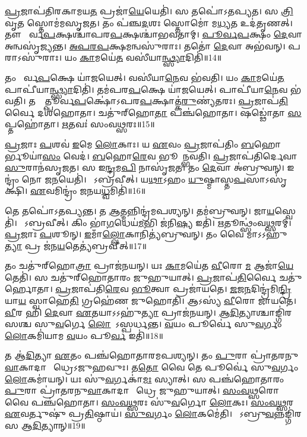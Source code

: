 \ul{𑌪𑍍𑌰}𑌜𑌾𑌪॑𑌤𑌿𑌰𑌕𑌾𑌮𑌯\ul{𑌤} 𑌪𑍍𑌰𑌜𑌾॑\ul{𑌯𑍇}𑌯𑍇𑌤𑌿॑।
𑌸 𑌤𑌪𑍋॑\-𑌽𑌤𑌪𑍍𑌯𑌤।
𑌸 \ul{𑌤𑍍𑌰𑌿}𑌵𑍃\ul{𑌤}\ul{} 𑌸𑍍𑌤𑍋𑌮॑𑌮𑌸𑍃𑌜𑌤।
𑌤𑌂 𑌪॑𑌞𑍍𑌚\ul{𑌦}𑌶𑌃 𑌸𑍍𑌤𑍋𑌮𑍋॑ 𑌮\ul{𑌧𑍍𑌯}𑌤 𑌉𑌦॑𑌤𑍃𑌣𑌤𑍍।
𑌤𑍗 𑌪𑍂᳚𑌰𑍍𑌵\ul{𑌪}𑌕𑍍𑌷𑌶𑍍𑌚𑌾॑𑌪𑌰\ul{𑌪}𑌕𑍍𑌷𑌶𑍍𑌚𑌾॑𑌭𑌵𑌤𑌾𑌮𑍍।
\ul{𑌪𑍂}\ul{𑌰𑍍𑌵}\ul{𑌪}𑌕𑍍𑌷𑌂 \ul{𑌦𑍇}𑌵𑌾 𑌅𑌨𑍍𑌵𑌸𑍃॑𑌜𑍍𑌯𑌨𑍍𑌤।
\ul{𑌅}\ul{𑌪}\ul{𑌰}\ul{𑌪}𑌕𑍍𑌷𑌮𑌨𑍍𑌵𑌸𑍁॑𑌰𑌾𑌃।
𑌤𑌤𑍋॑ \ul{𑌦𑍇}𑌵𑌾 𑌅𑌭॑𑌵𑌨𑍍।
𑌪𑌰𑌾𑌽𑌸𑍁॑𑌰𑌾𑌃।
𑌯𑌂 \ul{𑌕𑌾}𑌮𑌯𑍇॑\ul{𑌤} 𑌵𑌸𑍀॑𑌯𑌾\ul{𑌨𑍍𑌥𑍍𑌸𑍍𑌯𑌾}𑌦𑌿𑌤𑌿॑॥14॥

𑌤𑌂 𑌪𑍂᳚𑌰𑍍𑌵\ul{𑌪}𑌕𑍍𑌷𑍇 𑌯𑌾॑𑌜𑌯𑍇𑌤𑍍।
𑌵𑌸𑍀॑𑌯𑌾\ul{𑌨𑍇}𑌵 𑌭॑𑌵𑌤𑌿।
𑌯𑌂 \ul{𑌕𑌾}𑌮𑌯𑍇॑\ul{𑌤} 𑌪𑌾𑌪𑍀॑𑌯𑌾\ul{𑌨𑍍𑌥𑍍𑌸𑍍𑌯𑌾}𑌦𑌿𑌤𑌿॑।
𑌤𑌮॑𑌪𑌰\ul{𑌪}𑌕𑍍𑌷𑍇 𑌯𑌾॑𑌜𑌯𑍇𑌤𑍍।
𑌪𑌾𑌪𑍀॑𑌯𑌾\ul{𑌨𑍇}𑌵 𑌭॑𑌵𑌤𑌿।
𑌤𑌸𑍍𑌮𑌾᳚𑌤𑍍𑌪𑍂𑌰𑍍𑌵\ul{𑌪}𑌕𑍍𑌷𑍋॑\-𑌽𑌪𑌰\ul{𑌪}𑌕𑍍𑌷𑌾𑌤𑍍𑌕॑\ul{𑌰𑍁}𑌣𑍍𑌯॑𑌤𑌰𑌃।
\ul{𑌪𑍍𑌰}𑌜𑌾𑌪॑\ul{𑌤𑌿}𑌰𑍍𑌵𑍈 𑌦𑌶॑𑌹𑍋𑌤𑌾।
𑌚𑌤𑍁॑𑌰𑍍‌\mbox{}𑌹𑍋\ul{𑌤𑌾} 𑌪𑌞𑍍𑌚॑𑌹𑍋𑌤𑌾।
𑌷𑌡𑍍𑌢𑍋॑𑌤𑌾 \ul{𑌸}𑌪𑍍𑌤𑌹𑍋॑𑌤𑌾।
\ul{𑌋}𑌤𑌵𑌃॑ 𑌸𑌂𑌵\ul{𑌥𑍍𑌸}𑌰𑌃॥15॥

\ul{𑌪𑍍𑌰}𑌜𑌾𑌃 \ul{𑌪}𑌶𑌵॑ \ul{𑌇}𑌮𑍇 \ul{𑌲𑍋}𑌕𑌾𑌃।
𑌯 \ul{𑌏}𑌵𑌂 \ul{𑌪𑍍𑌰}𑌜𑌾𑌪॑𑌤𑌿𑌂 \ul{𑌬}𑌹𑍋𑌰𑍍𑌭𑍂𑌯𑌾॑\ul{𑌸𑌂} 𑌵𑍇𑌦॑।
\ul{𑌬}𑌹𑍋\ul{𑌰𑍇}𑌵 𑌭𑍂𑌯𑌾᳚𑌨𑍍𑌭𑌵𑌤𑌿।
\ul{𑌪𑍍𑌰}𑌜𑌾𑌪॑𑌤𑌿𑌰𑍍𑌦𑍇𑌵𑌾\ul{𑌸𑍁}𑌰𑌾𑌨॑𑌸𑍃𑌜𑌤।
𑌸 𑌇\ul{𑌨𑍍𑌦𑍍𑌰}𑌮\ul{𑌪𑌿} 𑌨𑌾𑌸𑍃॑𑌜𑌤।
𑌤𑌂 \ul{𑌦𑍇}𑌵𑌾 𑌅॑𑌬𑍍𑌰𑍁𑌵𑌨𑍍।
𑌇𑌨𑍍𑌦𑍍𑌰𑌂॑ 𑌨𑍋 𑌜\ul{𑌨}𑌯𑍇𑌤𑌿॑।
𑌸𑍋᳚𑌽𑌬𑍍𑌰𑌵𑍀𑌤𑍍।
𑌯\ul{𑌥𑌾}𑌽𑌹𑌂 \ul{𑌯𑍁}𑌷𑍍𑌮𑌾𑌸𑍍𑌤\ul{𑌪}𑌸𑌾\-𑌽𑌸𑍃॑𑌕𑍍𑌷𑌿।
\ul{𑌏}𑌵𑌮𑌿𑌨𑍍𑌦𑍍𑌰𑌂॑ 𑌜𑌨𑌯\ul{𑌧𑍍𑌵}𑌮𑌿𑌤𑌿॑॥16॥

𑌤𑍇 𑌤𑌪𑍋॑\-𑌽𑌤𑌪𑍍𑌯𑌨𑍍𑌤।
𑌤 \ul{𑌆}𑌤𑍍𑌮𑌨𑍍𑌨𑌿𑌨𑍍𑌦𑍍𑌰॑𑌮𑌪𑌶𑍍𑌯𑌨𑍍।
𑌤𑌮॑𑌬𑍍𑌰𑍁𑌵𑌨𑍍।
𑌜𑌾\ul{𑌯}𑌸𑍍𑌵𑍇𑌤𑌿॑।
𑌸𑍋᳚𑌽𑌬𑍍𑌰𑌵𑍀𑌤𑍍।
𑌕𑌿𑌂 𑌭𑌾॑\ul{𑌗}𑌧𑍇𑌯॑\ul{𑌮}𑌭𑌿 𑌜॑𑌨𑌿\ul{𑌷𑍍𑌯} 𑌇𑌤𑌿॑।
\ul{𑌋}𑌤𑍂𑌨𑍍𑌥𑍍𑌸𑌂॑𑌵\ul{𑌥𑍍𑌸}𑌰𑌮𑍍।
\ul{𑌪𑍍𑌰}𑌜𑌾𑌃 \ul{𑌪}𑌶𑍂𑌨𑍍।
\ul{𑌇}𑌮𑌾𑌁\ul{𑌲𑍍𑌲𑍋}𑌕𑌾𑌨𑌿𑌤𑍍𑌯॑𑌬𑍍𑌰𑍁𑌵𑌨𑍍।
𑌤𑌂 𑌵𑍈 𑌮𑌾𑌽𑌽𑌹𑍁॑\ul{𑌤𑍍𑌯𑌾} 𑌪𑍍𑌰 𑌜॑𑌨\ul{𑌯}𑌤𑍇𑌤𑍍𑌯॑𑌬𑍍𑌰𑌵𑍀𑌤𑍍॥17॥

𑌤𑌂 𑌚𑌤𑍁॑𑌰𑍍‌\mbox{}𑌹𑍋\ul{𑌤𑍍𑌰𑌾} 𑌪𑍍𑌰𑌾𑌜॑𑌨𑌯𑌨𑍍।
𑌯𑌃 \ul{𑌕𑌾}𑌮𑌯𑍇॑𑌤 \ul{𑌵𑍀}𑌰𑍋 \ul{𑌮} 𑌆𑌜𑌾॑\ul{𑌯𑍇}𑌤𑍇𑌤𑌿॑।
𑌸 𑌚𑌤𑍁॑𑌰𑍍‌\mbox{}𑌹𑍋𑌤𑌾𑌰𑌂 𑌜𑍁𑌹𑍁𑌯𑌾𑌤𑍍।
\ul{𑌪𑍍𑌰}𑌜𑌾𑌪॑\ul{𑌤𑌿}𑌰𑍍𑌵𑍈 𑌚𑌤𑍁॑𑌰𑍍\mbox{}𑌹𑍋𑌤𑌾।
\ul{𑌪𑍍𑌰}𑌜𑌾𑌪॑𑌤𑌿\ul{𑌰𑍇}𑌵 \ul{𑌭𑍂}𑌤𑍍𑌵𑌾 𑌪𑍍𑌰𑌜𑌾॑𑌯𑌤𑍇।
\ul{𑌜}𑌜\ul{𑌨}𑌦𑌿𑌨𑍍𑌦𑍍𑌰॑𑌮𑌿\ul{𑌨𑍍𑌦𑍍𑌰𑌿}𑌯𑌾\ul{𑌯} 𑌸𑍍𑌵𑌾𑌹𑍇\ul{𑌤𑌿} 𑌗𑍍𑌰𑌹𑍇॑𑌣 𑌜𑍁𑌹𑍋𑌤𑌿।
𑌆𑌽𑌸𑍍𑌯॑ \ul{𑌵𑍀}𑌰𑍋 𑌜𑌾॑𑌯𑌤𑍇।
\ul{𑌵𑍀}𑌰 𑌹𑌿 \ul{𑌦𑍇}𑌵𑌾 \ul{𑌏}𑌤𑌯𑌾\-𑌽𑌽𑌹𑍁॑\ul{𑌤𑍍𑌯𑌾} 𑌪𑍍𑌰𑌾𑌜॑𑌨𑌯𑌨𑍍।
\ul{𑌆}\ul{𑌦𑌿}𑌤𑍍𑌯𑌾𑌶𑍍𑌚𑌾𑌙𑍍𑌗𑌿॑𑌰𑌸𑌶𑍍𑌚 𑌸𑍁\ul{𑌵}𑌰𑍍𑌗𑍇 \ul{𑌲𑍋}𑌕𑍇᳚\-𑌽𑌸𑍍𑌪𑌰𑍍𑌧𑌨𑍍𑌤।
\ul{𑌵}𑌯𑌂 𑌪𑍂𑌰𑍍𑌵𑍇॑ 𑌸𑍁\ul{𑌵}𑌰𑍍𑌗𑌂 \ul{𑌲𑍋}𑌕𑌮𑌿॑𑌯𑌾𑌮 \ul{𑌵}𑌯𑌂 𑌪𑍂\ul{𑌰𑍍𑌵} 𑌇𑌤𑌿॑॥18॥

𑌤 𑌆॑\ul{𑌦𑌿}𑌤𑍍𑌯𑌾 \ul{𑌏}𑌤𑌂 𑌪𑌞𑍍𑌚॑𑌹𑍋𑌤𑌾𑌰𑌮𑌪𑌶𑍍𑌯𑌨𑍍।
𑌤𑌂 \ul{𑌪𑍁}𑌰𑌾 𑌪𑍍𑌰𑌾॑𑌤𑌰𑌨𑍁\ul{𑌵𑌾}𑌕𑌾𑌦𑌾𑌗𑍍𑌨𑍀᳚𑌧𑍍𑌰𑍇\-𑌽𑌜𑍁𑌹𑌵𑍁𑌃।
𑌤\ul{𑌤𑍋} 𑌵𑍈 𑌤𑍇 𑌪𑍂𑌰𑍍𑌵𑍇॑ 𑌸𑍁\ul{𑌵}𑌰𑍍𑌗𑌂 \ul{𑌲𑍋}𑌕𑌮𑌾॑𑌯𑌨𑍍।
𑌯𑌃 𑌸𑍁॑\ul{𑌵}𑌰𑍍𑌗𑌕𑌾॑\ul{𑌮𑌃} 𑌸𑍍𑌯𑌾𑌤𑍍।
𑌸 𑌪𑌞𑍍𑌚॑𑌹𑍋𑌤𑌾𑌰𑌂 \ul{𑌪𑍁}𑌰𑌾 𑌪𑍍𑌰𑌾॑𑌤𑌰𑌨𑍁\ul{𑌵𑌾}𑌕𑌾𑌦𑌾𑌗𑍍𑌨𑍀᳚𑌧𑍍𑌰𑍇 𑌜𑍁𑌹𑍁𑌯𑌾𑌤𑍍।
\ul{𑌸𑌂}\ul{𑌵}\ul{𑌥𑍍𑌸}𑌰𑍋 𑌵𑍈 𑌪𑌞𑍍𑌚॑𑌹𑍋𑌤𑌾।
\ul{𑌸𑌂}\ul{𑌵}\ul{𑌥𑍍𑌸}𑌰𑌃 𑌸𑍁॑\ul{𑌵}𑌰𑍍𑌗𑍋 \ul{𑌲𑍋}𑌕𑌃।
\ul{𑌸𑌂}\ul{𑌵}\ul{𑌥𑍍𑌸}𑌰 \ul{𑌏}𑌵𑌰𑍍𑌤𑍁𑌷𑍁॑ 𑌪𑍍𑌰\ul{𑌤𑌿}𑌷𑍍𑌠𑌾𑌯॑।
\ul{𑌸𑍁}\ul{𑌵}𑌰𑍍𑌗𑌂 \ul{𑌲𑍋}𑌕𑌮𑍇॑𑌤𑌿।
𑌤𑍇᳚𑌽𑌬𑍍𑌰𑍁\ul{𑌵}𑌨𑍍𑌨𑌙𑍍𑌗𑌿॑𑌰𑌸 𑌆\ul{𑌦𑌿}𑌤𑍍𑌯𑌾𑌨𑍍॥19॥

